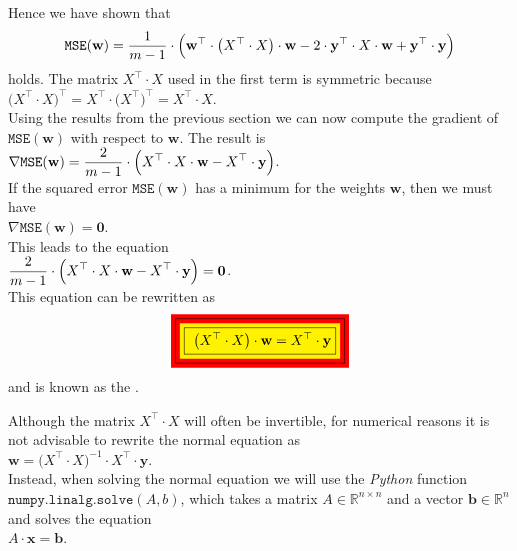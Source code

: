 Hence we have shown that
\begin{equation}
  \label{eq:squared-error-4}
  \mathtt{MSE}(\mathbf{w}) = \displaystyle \frac{1}{m-1} \cdot \Bigl(\mathbf{w}^\top \cdot \bigl(X^\top \cdot X\bigr) \cdot \mathbf{w} 
                                             - 2 \cdot \textbf{y}^\top \cdot X \cdot \mathbf{w} 
                                             + \mathbf{y}^\top \cdot \mathbf{y}
                                        \Bigr)
\end{equation}
holds.  The matrix $X^\top \cdot X$ used in the first term is symmetric because
\\[0.2cm]
\hspace*{1.3cm}
$\bigl(X^\top \cdot X\bigr)^\top = X^\top \cdot \bigl(X^\top\bigr)^\top = X^\top \cdot X$.
\\[0.2cm]
Using the results from the previous section we can now compute the gradient of $\mathtt{MSE}(\mathbf{w})$ with respect to
$\mathbf{w}$.  The result is
\\[0.2cm]
\hspace*{1.3cm}
$\displaystyle \nabla \mathtt{MSE}(\mathbf{w}) = \frac{2}{m-1} \cdot \Bigl(X^\top \cdot X \cdot \mathbf{w} - X^\top \cdot \mathbf{y}\Bigr)$.
\\[0.2cm]
If the squared error $\mathtt{MSE}(\mathbf{w})$ has a minimum for the weights $\mathbf{w}$, then we must have
\\[0.2cm]
\hspace*{1.3cm}
$\nabla \mathtt{MSE}(\mathbf{w}) = \mathbf{0}$.
\\[0.2cm]
This leads to the equation
\\[0.2cm]
\hspace*{1.3cm}
$\displaystyle\frac{2}{m-1} \cdot \Bigl(X^\top \cdot X \cdot \mathbf{w} - X^\top \cdot \mathbf{y}\Bigr) = \mathbf{0}$.
\\[0.2cm]
This equation can be rewritten as
\begin{equation}
  \label{eq:normal-equation}
 \colorbox{red}{\framebox{\colorbox{yellow}{\framebox{
 $\ds\bigl(X^\top \cdot X\bigr) \cdot \mathbf{w} = X^\top \cdot \mathbf{y}$}}}} 
\end{equation}
and is known as the .  

\remark
Although the matrix $X^\top \cdot X$ will often be invertible, for numerical reasons it is not
advisable to rewrite the normal equation as
\\[0.2cm]
\hspace*{1.3cm}
$\mathbf{w} = \bigl(X^\top \cdot X)^{-1} \cdot X^\top \cdot \mathbf{y}$.
\\[0.2cm]
Instead, when solving the normal equation we will use the \textsl{Python} function $\texttt{numpy.linalg.solve}(A,b)$, which
takes a matrix $A \in \mathbb{R}^{n \times n}$ and a vector $\mathbf{b} \in \mathbb{R}^n$ and solves the equation
\\[0.2cm]
\hspace*{1.3cm}
$A \cdot \mathbf{x} = \mathbf{b}$.  \eox

